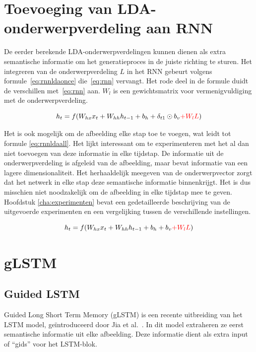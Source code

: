 \section{Toevoeging van LDA-onderwerpverdeling aan RNN}
De eerder berekende LDA-onderwerpverdelingen kunnen dienen als extra semantische informatie om het generatieproces in de juiste richting te sturen. Het integreren van de onderwerpverdeling $L$ in het RNN gebeurt volgens formule~\eqref{eq:rnnldaonce} die~\eqref{eq:rnn} vervangt. Het rode deel in de formule duidt de verschillen met~\eqref{eq:rnn} aan. $W_l$ is een gewichtsmatrix voor vermenigvuldiging met de onderwerpverdeling.

\begin{equation}
    h_t = f(W_{hx} x_{t} + W_{hh} h_{t-1} + b_h + \delta_{t1} \odot b_v \color{red}{+W_lL}\color{black})
    \label{eq:rnnldaonce}
\end{equation}

Het is ook mogelijk om de afbeelding elke stap toe te voegen, wat leidt tot formule \eqref{eq:rnnldaall}. Het lijkt interessant om te experimenteren met het al dan niet toevoegen van deze informatie in elke tijdstap. De informatie uit de onderwerpverdeling is afgeleid van de afbeelding, maar bevat informatie van een lagere dimensionaliteit. Het herhaaldelijk meegeven van de onderwerpvector zorgt dat het netwerk in elke stap deze semantische informatie binnenkrijgt. Het is dus misschien niet noodzakelijk om de afbeelding in elke tijdstap mee te geven. Hoofdstuk \ref{cha:experimenten} bevat een gedetailleerde beschrijving van de uitgevoerde experimenten en een vergelijking tussen de verschillende instellingen.

\begin{equation}
    h_t = f(W_{hx} x_{t} + W_{hh} h_{t-1} + b_h + b_v \color{red}{+W_lL}\color{black})
    \label{eq:rnnldaall}
\end{equation}


\section{gLSTM}
\subsection{Guided LSTM}
Guided Long Short Term Memory (gLSTM) is een recente uitbreiding van het LSTM model, ge\"introduceerd door Jia et al.~\cite{Fernando2015}. In dit model extraheren ze eerst semantische informatie uit elke afbeelding. Deze informatie dient als extra input of ``gids'' voor het LSTM-blok.

